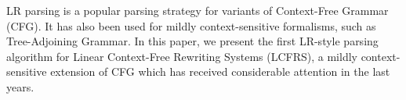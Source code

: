 LR parsing is a popular parsing strategy for variants of Context-Free Grammar (CFG). It has also been used for mildly context-sensitive formalisms, such as Tree-Adjoining Grammar. In this paper, we present the first LR-style parsing algorithm for Linear Context-Free Rewriting Systems (LCFRS), a mildly context-sensitive extension of CFG which has received considerable attention in the last years.
